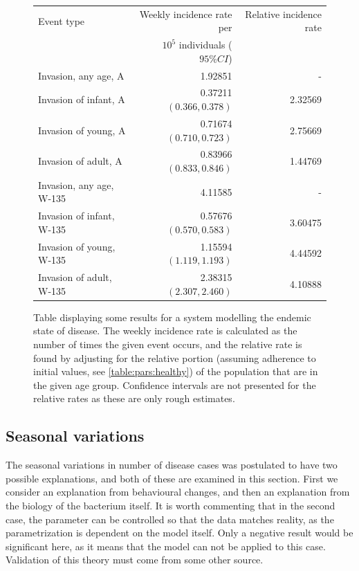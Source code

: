 \documentclass[10pt,a4paper]{article}
\begin{document}
\begin{figure}
	\begin{tabular}{l|r|r}	\hline
		Event type					& Weekly incidence rate per										& Relative incidence rate	 	\\
									& $10^5$ individuals ($95\% CI$)  																\\ \hline
		Invasion, any age, A		& 1.92851 														& -								\\
		Invasion of infant, A		& 0.37211 $(0.366, 0.378)$										& 2.32569						\\
		Invasion of young, A		& 0.71674 $(0.710, 0.723)$										& 2.75669						\\
		Invasion of adult, A		& 0.83966 $(0.833, 0.846)$										& 1.44769						\\
		Invasion, any age, W-135 	& 4.11585														& -								\\							
		Invasion of infant, W-135	& 0.57676 $(0.570, 0.583)$										& 3.60475						\\
		Invasion of young, W-135	& 1.15594 $(1.119, 1.193)$										& 4.44592						\\
		Invasion of adult, W-135	& 2.38315 $(2.307, 2.460)$										& 4.10888						\\ \hline
	\end{tabular}
	\caption{Table displaying some results for a system modelling the endemic state of disease. The weekly incidence rate is calculated as the number of times the given event occurs, and the relative rate is found by adjusting for the relative portion (assuming adherence to initial values, see \cref{table:pars:healthy}) of the population that are in the given age group. Confidence intervals are not presented for the relative rates as these are only rough estimates.} \label{table:results:incidence_endemic_1pop}
\end{figure}

\subsection{Seasonal variations}

The seasonal variations in number of disease cases was postulated to have two possible explanations, and both of these are examined in this section. First we consider an explanation from behavioural changes, and then an explanation from the biology of the bacterium itself. It is worth commenting that in the second case, the parameter can be controlled so that the data matches reality, as the parametrization is dependent on the model itself. Only a negative result would be significant here, as it means that the model can not be applied to this case. Validation of this theory must come from some other source.
\end{document}
